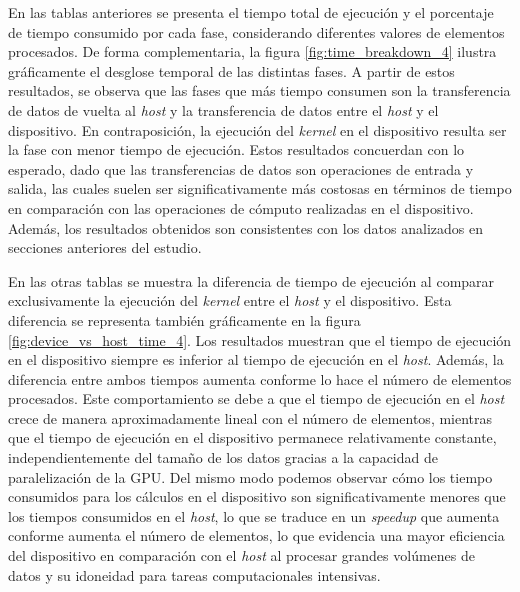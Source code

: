 \documentclass{article}
\begin{document}
			En las tablas anteriores se presenta el tiempo total de ejecución y el porcentaje de tiempo consumido por cada fase, considerando diferentes valores de elementos procesados. De forma complementaria, la figura \ref{fig:time_breakdown_4} ilustra gráficamente el desglose temporal de las distintas fases. A partir de estos resultados, se observa que las fases que más tiempo consumen son la transferencia de datos de vuelta al \textit{host} y la transferencia de datos entre el \textit{host} y el dispositivo. En contraposición, la ejecución del \textit{kernel} en el dispositivo resulta ser la fase con menor tiempo de ejecución. Estos resultados concuerdan con lo esperado, dado que las transferencias de datos son operaciones de entrada y salida, las cuales suelen ser significativamente más costosas en términos de tiempo en comparación con las operaciones de cómputo realizadas en el dispositivo. Además, los resultados obtenidos son consistentes con los datos analizados en secciones anteriores del estudio.

			En las otras tablas se muestra la diferencia de tiempo de ejecución al comparar exclusivamente la ejecución del \textit{kernel} entre el \textit{host} y el dispositivo. Esta diferencia se representa también gráficamente en la figura \ref{fig:device_vs_host_time_4}. Los resultados muestran que el tiempo de ejecución en el dispositivo siempre es inferior al tiempo de ejecución en el \textit{host}. Además, la diferencia entre ambos tiempos aumenta conforme lo hace el número de elementos procesados. Este comportamiento se debe a que el tiempo de ejecución en el \textit{host} crece de manera aproximadamente lineal con el número de elementos, mientras que el tiempo de ejecución en el dispositivo permanece relativamente constante, independientemente del tamaño de los datos gracias a la capacidad de paralelización de la GPU. Del mismo modo podemos observar cómo los tiempo consumidos para los cálculos en el dispositivo son significativamente menores que los tiempos consumidos en el \textit{host}, lo que se traduce en un \textit{speedup} que aumenta conforme aumenta el número de elementos, lo que evidencia una mayor eficiencia del dispositivo en comparación con el \textit{host} al procesar grandes volúmenes de datos y su idoneidad para tareas computacionales intensivas.
\end{document}
